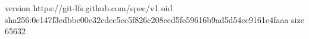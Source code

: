 version https://git-lfs.github.com/spec/v1
oid sha256:0e147f3edbbe00e32cdcc5cc5f826c208ced5fe59616b9ad5d54cc9161e4faaa
size 65632
